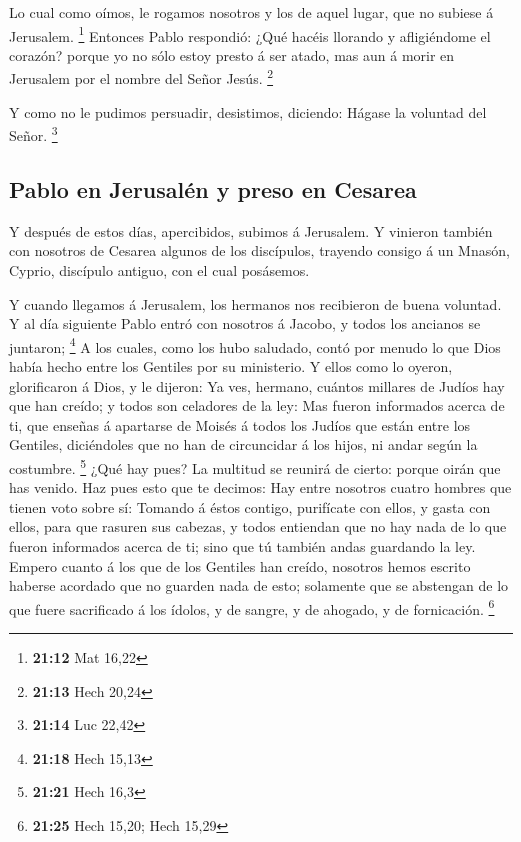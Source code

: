  Lo cual como oímos, le rogamos nosotros y los de aquel
lugar, que no subiese á Jerusalem. \footnote{\textbf{21:12} Mat 16,22}
 Entonces Pablo respondió: ¿Qué hacéis llorando y
afligiéndome el corazón? porque yo no sólo estoy presto á ser atado, mas
aun á morir en Jerusalem por el nombre del Señor Jesús. \footnote{\textbf{21:13}
  Hech 20,24}

 Y como no le pudimos persuadir, desistimos, diciendo:
Hágase la voluntad del Señor. \footnote{\textbf{21:14} Luc 22,42}

\hypertarget{pablo-en-jerusaluxe9n-y-preso-en-cesarea}{%
\subsection{Pablo en Jerusalén y preso en
Cesarea}\label{pablo-en-jerusaluxe9n-y-preso-en-cesarea}}

 Y después de estos días, apercibidos, subimos á Jerusalem.
 Y vinieron también con nosotros de Cesarea algunos de los
discípulos, trayendo consigo á un Mnasón, Cyprio, discípulo antiguo, con
el cual posásemos.

 Y cuando llegamos á Jerusalem, los hermanos nos recibieron
de buena voluntad.  Y al día siguiente Pablo entró con
nosotros á Jacobo, y todos los ancianos se juntaron; \footnote{\textbf{21:18}
  Hech 15,13}  A los cuales, como los hubo saludado, contó
por menudo lo que Dios había hecho entre los Gentiles por su ministerio.
 Y ellos como lo oyeron, glorificaron á Dios, y le dijeron:
Ya ves, hermano, cuántos millares de Judíos hay que han creído; y todos
son celadores de la ley:  Mas fueron informados acerca de
ti, que enseñas á apartarse de Moisés á todos los Judíos que están entre
los Gentiles, diciéndoles que no han de circuncidar á los hijos, ni
andar según la costumbre. \footnote{\textbf{21:21} Hech 16,3}
 ¿Qué hay pues? La multitud se reunirá de cierto: porque
oirán que has venido.  Haz pues esto que te decimos: Hay
entre nosotros cuatro hombres que tienen voto sobre sí: 
Tomando á éstos contigo, purifícate con ellos, y gasta con ellos, para
que rasuren sus cabezas, y todos entiendan que no hay nada de lo que
fueron informados acerca de ti; sino que tú también andas guardando la
ley.  Empero cuanto á los que de los Gentiles han creído,
nosotros hemos escrito haberse acordado que no guarden nada de esto;
solamente que se abstengan de lo que fuere sacrificado á los ídolos, y
de sangre, y de ahogado, y de fornicación. \footnote{\textbf{21:25} Hech
  15,20; Hech 15,29}

